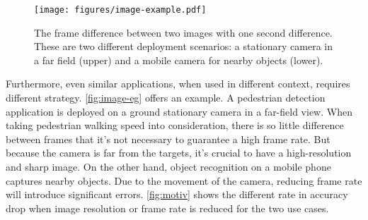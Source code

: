 \begin{figure}
  \centering
  \texttt{[image: figures/image-example.pdf]}
  \caption{The frame difference between two images with one second difference.
    These are two different deployment scenarios: a stationary camera in a far
    field (upper) and a mobile camera for nearby objects (lower).}
  \label{fig:image-eg}
\end{figure}

Furthermore, even similar applications, when used in different context, requires
different strategy. \autoref{fig:image-eg} offers an example. A pedestrian
detection application is deployed on a ground stationary camera in a far-field
view. When taking pedestrian walking speed into consideration, there is so
little difference between frames that it's not necessary to guarantee a high
frame rate. But because the camera is far from the targets, it's crucial to have
a high-resolution and sharp image. On the other hand, object recognition on a
mobile phone captures nearby objects. Due to the movement of the camera,
reducing frame rate will introduce significant errors. \autoref{fig:motiv} shows
the different rate in accuracy drop when image resolution or frame rate is
reduced for the two use cases.

